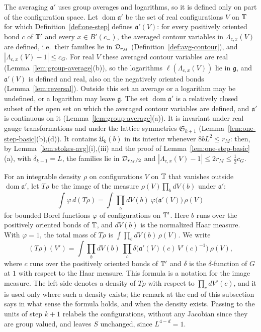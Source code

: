 The averaging $\mathfrak a'$ uses group averages and logarithms, so it is defined only on part of the configuration space. Let $\operatorname{dom}\mathfrak a'$ be the set of real configurations $V$ on $\mathbb T$ for which Definition~\ref{def:one-step} defines $\mathfrak a'(V)$: for every positively oriented bond $c$ of $\mathbb T'$ and every $x\in B'(c_-)$, the averaged contour variables in $\Lambda_{c,x}(V)$ are defined, i.e.\ their families lie in $\mathcal D_{r_M}$ (Definition~\ref{def:avg-contour}), and $|\Lambda_{c,x}(V)-1|\le c_G$. For real $V$ these averaged contour variables are real (Lemma~\ref{lem:group-average}(b)), so the logarithms $\ell(\Lambda_{c,x}(V))$ lie in $\mathfrak g$, and $\mathfrak a'(V)$ is defined and real, also on the negatively oriented bonds (Lemma~\ref{lem:reversal}). Outside this set an average or a logarithm may be undefined, or a logarithm may leave $\mathfrak g$. The set $\operatorname{dom}\mathfrak a'$ is a relatively closed subset of the open set on which the averaged contour variables are defined, and $\mathfrak a'$ is continuous on it (Lemma~\ref{lem:group-average}(a)). It is invariant under real gauge transformations and under the lattice symmetries $\mathfrak S_{k+1}$ (Lemma~\ref{lem:one-step-basic}(b),(d)). It contains $\mathfrak U_k(b)$ in its interior whenever $8bL^2\le r_M$: then, by Lemma~\ref{lem:stokes-avg}(i),(iii) and the proof of Lemma~\ref{lem:one-step-basic}(a), with $\delta_{k+1}=L$, the families lie in $\mathcal D_{r_M/2}$ and $|\Lambda_{c,x}(V)-1|\le2r_M\le\frac12c_G$.

For an integrable density $\rho$ on configurations $V$ on $\mathbb T$ that vanishes outside $\operatorname{dom}\mathfrak a'$, let $T\rho$ be the image of the measure $\rho(V)\prod_bdV(b)$ under $\mathfrak a'$:
\[
\int\varphi\,d(T\rho)=\int\prod_bdV(b)\ \varphi\big(\mathfrak a'(V)\big)\,\rho(V)
\]
for bounded Borel functions $\varphi$ of configurations on $\mathbb T'$. Here $b$ runs over the positively oriented bonds of $\mathbb T$, and $dV(b)$ is the normalized Haar measure. With $\varphi=1$, the total mass of $T\rho$ is $\int\prod_bdV(b)\,\rho(V)$. We write
\begin{equation}\label{eq:rg-map}
(T\rho)(V')=\int\prod_{b}dV(b)\ \prod_{c}\delta\big(\mathfrak a'(V)(c)\,V'(c)^{-1}\big)\ \rho(V),
\end{equation}
where $c$ runs over the positively oriented bonds of $\mathbb T'$ and $\delta$ is the $\delta$-function of $G$ at $1$ with respect to the Haar measure. This formula is a notation for the image measure. The left side denotes a density of $T\rho$ with respect to $\prod_cdV'(c)$, and it is used only where such a density exists; the remark at the end of this subsection says in what sense the formula holds, and when the density exists. Passing to the units of step $k+1$ relabels the configurations, without any Jacobian since they are group valued, and leaves $S$ unchanged, since $L^{4-d}=1$.

